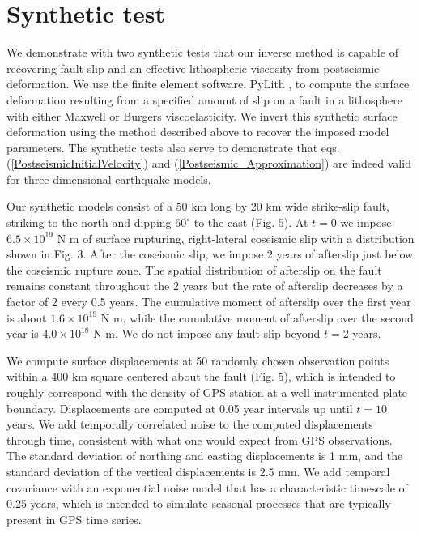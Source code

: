 \documentclass[extra,mreferee]{gji}
\begin{document}
\section{Synthetic test}\label{SynthTest}
We demonstrate with two synthetic tests that our inverse method is
capable of recovering fault slip and an effective lithospheric
viscosity from postseismic deformation.  We use the finite element
software, PyLith \citep{A2007}, to compute the surface deformation
resulting from a specified amount of slip on a fault in a lithosphere
with either Maxwell or Burgers viscoelasticity.  We invert this
synthetic surface deformation using the method described above to
recover the imposed model parameters.  The synthetic tests also serve
to demonstrate that eqs. (\ref{PostseismicInitialVelocity}) and
(\ref{Postseismic_Approximation}) are indeed valid for three
dimensional earthquake models.

Our synthetic models consist of a 50 km long by 20 km wide strike-slip
fault, striking to the north and dipping $60^{\circ}$ to the east
(Fig. 5). At $t=0$ we impose $6.5\times 10^{19}$ N m of surface
rupturing, right-lateral coseismic slip with a distribution shown in
Fig. 3. After the coseismic slip, we impose 2 years of afterslip just
below the coseismic rupture zone.  The spatial distribution of
afterslip on the fault remains constant throughout the 2 years but the
rate of afterslip decreases by a factor of 2 every 0.5 years.  The
cumulative moment of afterslip over the first year is about $1.6\times
10^{19}$ N m, while the cumulative moment of afterslip over the second
year is $4.0\times 10^{18}$ N m.  We do not impose any fault slip
beyond $t=2$ years.

We compute surface displacements at 50 randomly chosen observation
points within a 400 km square centered about the fault (Fig. 5), which
is intended to roughly correspond with the density of GPS station at a
well instrumented plate boundary.  Displacements are computed at 0.05
year intervals up until $t=10$ years.  We add temporally correlated
noise to the computed displacements through time, consistent with what
one would expect from GPS observations.  The standard deviation of
northing and easting displacements is 1 mm, and the standard deviation
of the vertical displacements is 2.5 mm.  We add temporal covariance
with an exponential noise model that has a characteristic timescale of
0.25 years, which is intended to simulate seasonal processes that are
typically present in GPS time series.
\end{document}
